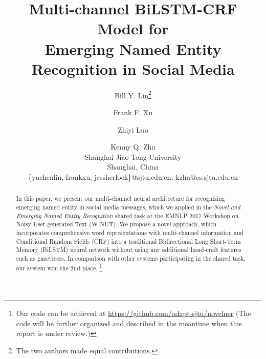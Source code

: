 \documentclass[11pt,letterpaper]{article}
\title{Multi-channel BiLSTM-CRF Model for\\  Emerging Named Entity Recognition in Social Media}
\author{Bill Y. Lin\thanks{\quad The two authors made equal contributions.} \and Frank F. Xu\footnotemark[1] \and Zhiyi Luo \and Kenny Q. Zhu \\
	Shanghai Jiao Tong University \\ Shanghai, China\\ \{yuchenlin, frankxu, jessherlock\}@sjtu.edu.cn, kzhu@cs.sjtu.edu.cn}
\begin{document}
\maketitle
\begin{abstract}
In this paper, we present our multi-channel neural architecture for recognizing emerging named entity in social media messages,
which we applied in the \textit{Novel and Emerging Named Entity Recognition} shared task 
at the EMNLP
2017 Workshop on Noisy User-generated Text (W-NUT).  
We propose a novel approach, which incorporates comprehensive word representations with multi-channel information and Conditional Random Fields (CRF) into a traditional Bidirectional Long Short-Term Memory
(BiLSTM) neural network 
without using any additional hand-craft features such as gazetteers. 
In comparison with other systems participating in the shared task, our system won the 2nd place. 
\footnote{Our code can be achieved at \url{https://github.com/adapt-sjtu/novelner}  (The code will be further organized and described in the meantime when this report is under review.)}
\end{abstract}









\end{document}
